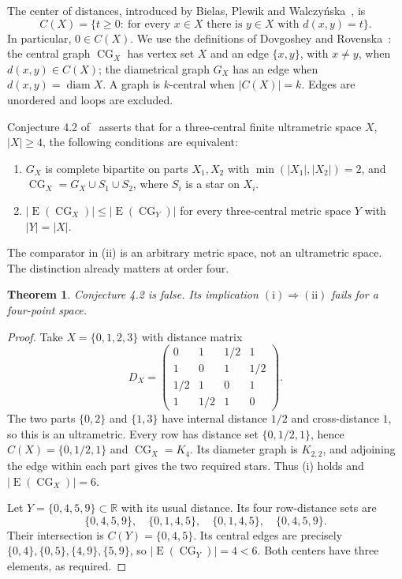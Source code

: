 \documentclass[11pt]{article}
\newtheorem{theorem}{Theorem}
\newcommand{\CG}{\operatorname{CG}}
\newcommand{\E}{\operatorname{E}}
\newcommand{\diam}{\operatorname{diam}}
\begin{document}
The center of distances, introduced by Bielas, Plewik and
Walczy\'nska~\cite{BPW}, is
\[
 C(X)=\{t\ge0:\ \text{for every }x\in X\text{ there is }y\in X
                   \text{ with }d(x,y)=t\}.
\]
In particular, $0\in C(X)$. We use the definitions of
Dovgoshey and Rovenska~\cite[Definitions 1.2 and 2.14]{DR}:
the central graph $\CG_X$ has vertex set $X$ and an edge $\{x,y\}$,
with $x\ne y$, when $d(x,y)\in C(X)$; the diametrical graph $G_X$
has an edge when $d(x,y)=\diam X$. A graph is $k$-central when
$|C(X)|=k$. Edges are unordered and loops are excluded.

Conjecture 4.2 of~\cite[Section 4, p.~13]{DR} asserts that for a
three-central finite ultrametric space $X$, $|X|\ge4$, the following
conditions are equivalent:
\begin{enumerate}
\item[(i)] $G_X$ is complete bipartite on parts $X_1,X_2$ with
$\min(|X_1|,|X_2|)=2$, and $\CG_X=G_X\cup S_1\cup S_2$, where
$S_i$ is a star on $X_i$.
\item[(ii)] $|\E(\CG_X)|\le |\E(\CG_Y)|$ for every three-central
metric space $Y$ with $|Y|=|X|$.
\end{enumerate}
The comparator in (ii) is an arbitrary metric space, not an ultrametric
space. The distinction already matters at order four.

\begin{theorem}\label{thm:four}
Conjecture 4.2 is false. Its implication $\mathrm{(i)}\Rightarrow
\mathrm{(ii)}$ fails for a four-point space.
\end{theorem}
\begin{proof}
Take $X=\{0,1,2,3\}$ with distance matrix
\[
 D_X=\begin{pmatrix}
 0&1&1/2&1\\1&0&1&1/2\\1/2&1&0&1\\1&1/2&1&0
 \end{pmatrix}.
\]
The two parts $\{0,2\}$ and $\{1,3\}$ have internal distance $1/2$
and cross-distance $1$, so this is an ultrametric. Every row has
distance set $\{0,1/2,1\}$, hence $C(X)=\{0,1/2,1\}$ and
$\CG_X=K_4$. Its diameter graph is $K_{2,2}$, and adjoining the edge
within each part gives the two required stars. Thus (i) holds and
$|\E(\CG_X)|=6$.

Let $Y=\{0,4,5,9\}\subset\mathbb R$ with its usual distance.
Its four row-distance sets are
\[
 \{0,4,5,9\},\quad\{0,1,4,5\},\quad
 \{0,1,4,5\},\quad\{0,4,5,9\}.
\]
Their intersection is $C(Y)=\{0,4,5\}$. Its central edges are precisely
$\{0,4\},\{0,5\},\{4,9\},\{5,9\}$, so
$|\E(\CG_Y)|=4<6$. Both centers have three elements, as required.
\end{proof}
\end{document}
